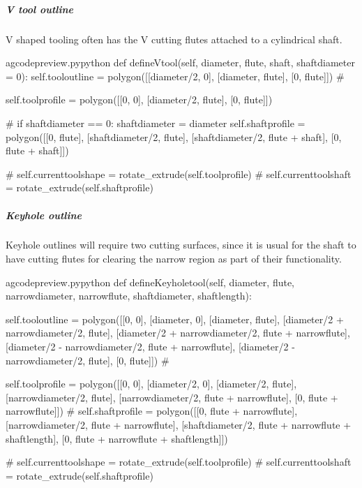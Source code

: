 \documentclass{ltxdoc}
\begin{document}
\subparagraph{V tool outline}

V shaped tooling often has the V cutting flutes attached to a cylindrical shaft.

\lstset{firstnumber=\thegcpy}
\begin{writecode}{a}{gcodepreview.py}{python}
    def defineVtool(self, diameter, flute, shaft, shaftdiameter = 0):
        self.tooloutline = polygon([[diameter/2, 0], [diameter, flute], [0, flute]])
#

        self.toolprofile = polygon([[0, 0], [diameter/2, flute], [0, flute]])

#
        if shaftdiameter == 0:
            shaftdiameter = diameter
        self.shaftprofile = polygon([[0, flute], [shaftdiameter/2, flute], [shaftdiameter/2, flute + shaft], [0, flute + shaft]])

#
        self.currenttoolshape = rotate_extrude(self.toolprofile)
#
        self.currenttoolshaft = rotate_extrude(self.shaftprofile) 

\end{writecode}
\addtocounter{gcpy}{16}

\subparagraph{Keyhole outline}

Keyhole outlines will require two cutting surfaces, since it is usual for the shaft to have cutting flutes for clearing the narrow region as part of their functionality.

\lstset{firstnumber=\thegcpy}
\begin{writecode}{a}{gcodepreview.py}{python}
    def defineKeyholetool(self, diameter, flute, narrowdiameter, narrowflute, shaftdiameter, shaftlength):

        self.tooloutline = polygon([[0, 0], [diameter, 0], [diameter, flute], [diameter/2 + narrowdiameter/2, flute], [diameter/2 + narrowdiameter/2, flute + narrowflute], [diameter/2 - narrowdiameter/2, flute + narrowflute], [diameter/2 - narrowdiameter/2, flute], [0, flute]])
#

        self.toolprofile = polygon([[0, 0], [diameter/2, 0], [diameter/2, flute], [narrowdiameter/2, flute], [narrowdiameter/2, flute + narrowflute], [0, flute + narrowflute]])
#
        self.shaftprofile = polygon([[0, flute + narrowflute], [narrowdiameter/2, flute + narrowflute], [shaftdiameter/2, flute + narrowflute + shaftlength], [0, flute + narrowflute + shaftlength]])

#
        self.currenttoolshape = rotate_extrude(self.toolprofile)
#
        self.currenttoolshaft = rotate_extrude(self.shaftprofile) 

\end{writecode}
\addtocounter{gcpy}{14}
\end{document}
